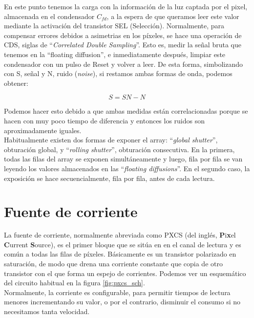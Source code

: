 En este punto tenemos la carga con la información de la luz captada por el pixel,
almacenada en el condensador $C_{fd}$, a la espera de que queramos leer este valor
mediante la activación del transistor SEL (Selección). Normalmente, para compensar
errores debidos a asimetrias en los píxeles, se hace una operación de CDS, siglas de
``\textit{Correlated Double Sampling}''. Esto es, medir la señal bruta que tenemos
en la ``floating diffusion'', e inmediatamente después, limpiar este condensador con
un pulso de Reset y volver a leer. De esta forma, simbolizando con S, señal y N,
ruido (\textit{noise}), si restamos ambas formas de onda, podemos obtener:

\begin{equation}
	\label{eq:CDS_operation}
	S = SN - N
\end{equation}

Podemos hacer esto debido a que ambas medidas  están correlacionadas porque se
hacen con muy poco tiempo de diferencia y entonces los ruidos son aproximadamente
iguales.\\

Habitualmente existen dos formas de exponer el array: ``\textit{global shutter}'',
obturación global, y ``\textit{rolling shutter}'', obturación consecutiva. En la
primera, todas las filas del array se exponen simultáneamente y luego, fila por fila
se van leyendo los valores almacenados en las ``\textit{floating diffusions}''. En
el segundo caso, la exposición se hace secuencialmente, fila por fila, antes de cada
lectura.\\

\section{Fuente de corriente}\label{cap:ro_sch_pxcs}

La fuente de corriente, normalmente abreviada como PXCS (del inglés,
\textbf{P}i\textbf{x}el \textbf{C}urrent \textbf{S}ource),
es el primer bloque que se sitúa en
en el canal de lectura y es común a todas las filas de píxeles. Básicamente
es un transistor polarizado en saturación, de modo que drena una corriente
constante que copia de otro transistor con el que forma un espejo de corrientes.
Podemos ver un esquemático del circuito habitual en la figura \ref{fig:pxcs_sch}.\\

Normalmente, la corriente es configurable, para permitir tiempos de lectura menores
incrementando su  valor, o por el contrario, disminuir el consumo si no necesitamos tanta
velocidad.

